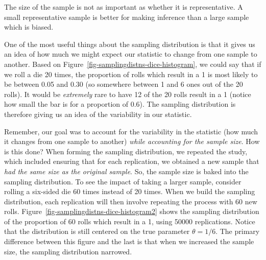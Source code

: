 \documentclass[
  letterpaper,
  DIV=11,
  numbers=noendperiod]{scrreprt}
\theoremstyle{definition}
\theoremstyle{definition}
\theoremstyle{plain}
\theoremstyle{remark}
\begin{document}
\begin{tcolorbox}[enhanced jigsaw, colbacktitle=quarto-callout-tip-color!10!white, colback=white, left=2mm, title=\textcolor{quarto-callout-tip-color}{\faLightbulb}\hspace{0.5em}{Big Idea}, toptitle=1mm, leftrule=.75mm, breakable, bottomrule=.15mm, arc=.35mm, rightrule=.15mm, toprule=.15mm, coltitle=black, opacityback=0, colframe=quarto-callout-tip-color-frame, opacitybacktitle=0.6, bottomtitle=1mm, titlerule=0mm]

The size of the sample is not as important as whether it is
representative. A small representative sample is better for making
inference than a large sample which is biased.

\end{tcolorbox}

One of the most useful things about the sampling distribution is that it
gives us an idea of how much we might expect our statistic to change
from one sample to another. Based on
Figure~\ref{fig-samplingdistns-dice-histogram}, we could say that if we
roll a die 20 times, the proportion of rolls which result in a 1 is most
likely to be between 0.05 and 0.30 (so somewhere between 1 and 6 ones
out of the 20 rolls). It would be \emph{extremely} rare to have 12 of
the 20 rolls result in a 1 (notice how small the bar is for a proportion
of 0.6). The sampling distribution is therefore giving us an idea of the
variability in our statistic.

Remember, our goal was to account for the variability in the statistic
(how much it changes from one sample to another) \emph{while accounting
for the sample size}. How is this done? When forming the sampling
distribution, we repeated the study, which included ensuring that for
each replication, we obtained a new sample that \emph{had the same size
as the original sample}. So, the sample size is baked into the sampling
distribution. To see the impact of taking a larger sample, consider
rolling a six-sided die 60 times instead of 20 times. When we build the
sampling distribution, each replication will then involve repeating the
process with 60 new rolls.
Figure~\ref{fig-samplingdistns-dice-histogram2} shows the sampling
distribution of the proportion of 60 rolls which result in a 1, using
50000 replications. Notice that the distribution is still centered on
the true parameter \(\theta = 1/6\). The primary difference between this
figure and the last is that when we increased the sample size, the
sampling distribution narrowed.
\end{document}
